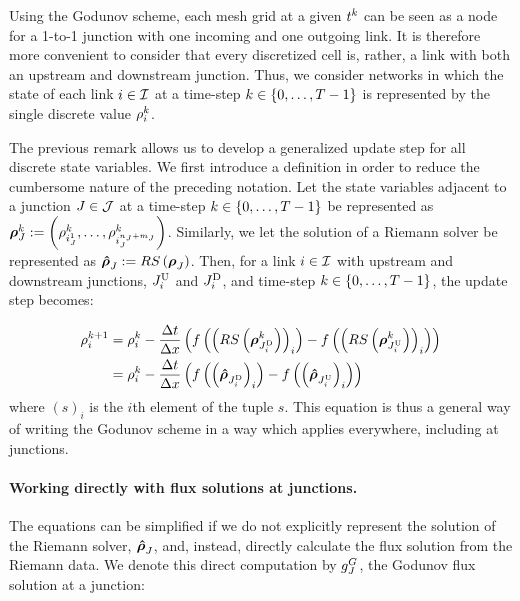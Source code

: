 \begin{rem}
Using the Godunov scheme, each mesh grid at a given $t^{k}$ can
be seen as a node for a 1-to-1 junction with one incoming and one
outgoing link. It is therefore more convenient to consider that every
discretized cell is, rather, a link with both an upstream and downstream
junction. Thus, we consider networks in which the state of each link
$i\in\mathcal{I}$ at a time-step $k\in\left\{ 0,\ldots,T-1\right\}$ is represented
by the single discrete value $\rho_{i}^{k}$.
\end{rem}
The previous remark allows us to develop a generalized update step
for all discrete state variables. We first introduce a definition
in order to reduce the cumbersome nature of the preceding notation.
Let the state variables adjacent to a junction $J\in\mathcal{J}$ at a
time-step $k\in\left\{ 0,\ldots,T-1\right\}$ be represented as $\juncstate{\jn}{\tind}\defeq\tuple{\discrete{\link_{\jn}^{1}}{\tind}}{\discrete{\link_{\jn}^{\ninc_{\jn}+\nout_{\jn}}}{\tind}}$.
Similarly, we let the solution of a Riemann solver be represented
as $\junctrace{\jn}{}\defeq\RS\left(\juncstate{\jn}{}\right)$. Then,
for a link $i\in\mathcal{I}$ with upstream and downstream junctions,
$J_{i}^{\text{U}}$ and $J_{i}^{\text{D}}$, and time-step $k\in\left\{ 0,\ldots,T-1\right\} $,
the update step becomes:

\begin{align}
\discrete{\link}{\tind+1} & =\discrete{\link}{\tind}-\dfrac{\Delta t}{\Delta x}\left(f\left(\left(\RS\left(\juncstate{\jdown{\link}}{\tind}\right)\right)_{\link}\right)-f\left(\left(\RS\left(\juncstate{\jup{\link}}{\tind}\right)\right)_{\link}\right)\right)\nonumber \\
 & =\discrete{\link}{\tind}-\dfrac{\Delta t}{\Delta x}\left(f\left(\left(\junctrace{\jdown{\link}}{}\right)_{\link}\right)-f\left(\left(\junctrace{\jup{\link}}{}\right)_{\link}\right)\right)\label{eq:reg-update}
\end{align}
where $\left(s\right)_{i}$ is the $i$th element of the tuple $s$.
This equation is thus a general way of writing the Godunov scheme
in a way which applies everywhere, including at junctions.


\paragraph{Working directly with flux solutions at junctions.\label{par:Composing-the-Riemann}}

The equations can be simplified if we do not explicitly represent
the solution of the Riemann solver, $\junctrace{\jn}{}$, and, instead,
directly calculate the flux solution from the Riemann data. We denote
this direct computation by $g^{G}_{J}$, the Godunov flux solution
at a junction:


